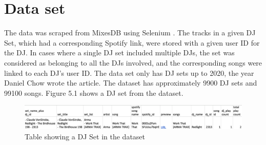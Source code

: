 \section{Data set}
The data was scraped from MixesDB using Selenium \citep{chow_music_2020}. The tracks in a given DJ Set, which had a corresponding Spotify link, were stored with a given user ID for the DJ. In cases where a single DJ set included multiple DJs, the set was considered as belonging to all the DJs involved, and the corresponding songs were linked to each DJ's user ID. The data set only has DJ sets up to 2020, the year Daniel Chow wrote the article. The dataset has approximately 9900 DJ sets and 99100 songs. Figure 5.1 shows a DJ set from the dataset.
\begin{figure}[H]
	\includegraphics[scale=0.4]{images/dataset}
	\centering
	\caption{Table showing a DJ Set in the dataset} 
\end{figure}


